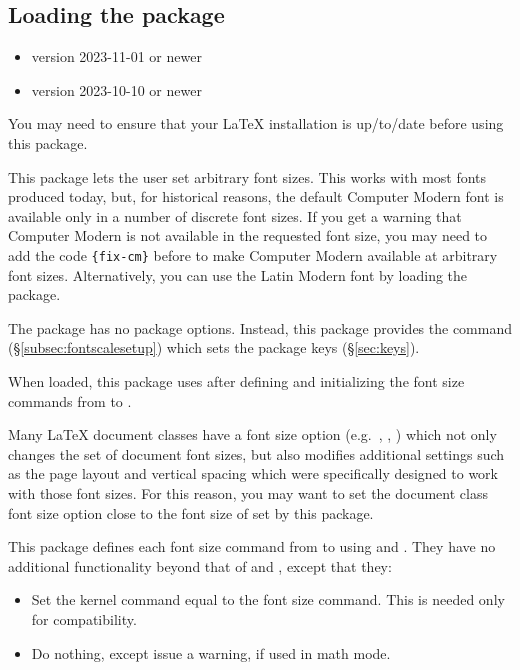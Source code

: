 \documentclass{beery}
\begin{document}
\subsection{Loading the package}
\label{subsec:loading}

\begin{itemize}
  \item \LaTeXe{} version 2023-11-01 or newer
  \item {} version 2023-10-10 or newer
\end{itemize}

You may need to ensure that your \LaTeX{} installation is up\-/to\-/date before using this package.

This package lets the user set arbitrary font sizes.
This works with most fonts produced today, but, for historical reasons, the default Computer Modern font is available only in a number of discrete font sizes.
If you get a warning that Computer Modern is not available in the requested font size, you may need to add the code \allowbreak\verb|{fix-cm}| before  to make Computer Modern available at arbitrary font sizes.
Alternatively, you can use the Latin Modern font by loading the  package.

The  package has no package options.
Instead, this package provides the command  (\S\ref{subsec:fontscalesetup}) which sets the package keys (\S\ref{sec:keys}).

When loaded, this package uses  after defining and initializing the font size commands from  to .

Many \LaTeX{} document classes have a font size option (e.g.\ \Key{10pt}, \Key{11pt}, \Key{12pt}) which not only changes the set of document font sizes, but also modifies additional settings such as the page layout and vertical spacing which were specifically designed to work with those font sizes.
For this reason, you may want to set the document class font size option close to the font size of  set by this package.

\listheading
  {
    This package defines each font size command from  to  using  and .
    They have no additional functionality beyond that of  and , except that they:
  }
\begin{itemize}
  \item
  Set the kernel command  equal to the font size command.
  This is needed only for compatibility.
  \item
  Do nothing, except issue a warning, if used in math mode.
\end{itemize}
\end{document}
